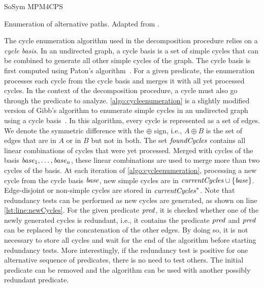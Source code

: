 \begin{copiedFrom}{SoSym MPM4CPS}
\begin{algorithm}
    
    \caption[Enumeration of alternative paths]{Enumeration of alternative paths. Adapted from .}
    \label{algo:cycleenumeration}
\end{algorithm}

The cycle enumeration algorithm used in the decomposition procedure relies on a \textit{cycle basis}. In an undirected graph, a cycle basis is a set of simple cycles that can be combined to generate all other simple cycles of the graph. The cycle basis is first computed using Paton's algorithm~\cite{paton1969algorithm}. For a given predicate, the enumeration processes each cycle from the cycle basis and merges it with all yet processed cycles. In the context of the decomposition procedure, a cycle must also go through the predicate to analyze. \autoref{algo:cycleenumeration} is a slightly modified version of Gibb's algorithm to enumerate simple cycles in an undirected graph using a cycle basis~\cite{gibbs1969cycle}. In this algorithm, every cycle is represented as a set of edges. We denote the symmetric difference with the $\oplus$ sign, i.e., $A \oplus B$ is the set of edges that are in $A$ or in $B$ but not in both. The set $\mathit{foundCycles}$ contains all linear combinations of cycles that were yet processed. Merged with cycles of the basis $\mathit{base}_1, \dots, \mathit{base}_n$, these linear combinations are used to merge more than two cycles of the basis. At each iteration of \autoref{algo:cycleenumeration}, processing a new cycle from the cycle basis $\mathit{base}$, new simple cycles are in $\mathit{currentCycles} \cup \{\mathit{base}\}$. Edge-disjoint or non-simple cycles are stored in $\mathit{currentCycles}^*$. Note that redundancy tests can be performed as new cycles are generated, as shown on line \ref{lst:line:newCycles}. For the given predicate $\mathit{pred}$, it is checked whether one of the newly generated cycles is redundant, i.e., it contains the predicate $\mathit{pred}$ and $\mathit{pred}$ can be replaced by the concatenation of the other edges. By doing so, it is not necessary to store all cycles and wait for the end of the algorithm before starting redundancy tests. More interestingly, if the redundancy test is positive for one alternative sequence of predicates, there is no need to test others. The initial predicate can be removed and the algorithm can be used with another possibly redundant predicate.
  

\end{copiedFrom}
